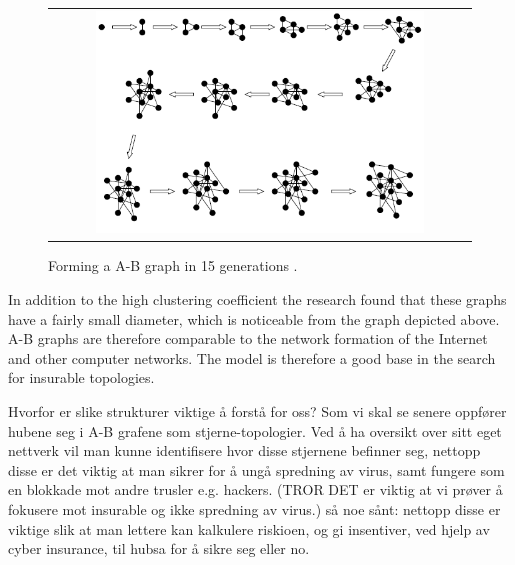 \begin{figure}
\centering
\begin{tabular}{@{}c@{}}
\includegraphics[width=0.8\textwidth]{../Figures/ABgraphcreation.png}
\end{tabular}
\caption{\label{fig:ABgraphcreation} Forming a A-B graph in 15 generations \cite{audestad}.}
\end{figure}

In addition to the high clustering coefficient the research found that these graphs have a fairly small diameter,
 which is noticeable from the graph depicted above. 
 A-B graphs are therefore comparable to the network formation of the Internet and other computer networks. 
The model is therefore a good base in the search for insurable topologies. 


Hvorfor er slike strukturer viktige å forstå for oss? 
Som vi skal se senere oppfører hubene seg i A-B grafene som stjerne-topologier. 
Ved å ha oversikt over sitt eget nettverk vil man kunne identifisere hvor disse stjernene befinner seg, nettopp disse er det viktig at man sikrer for å ungå spredning av virus, samt fungere som en blokkade mot andre trusler e.g. hackers. (TROR DET er viktig at vi prøver å fokusere mot insurable og ikke spredning av virus.)
så noe sånt:
nettopp disse er viktige slik at man lettere kan kalkulere riskioen, og gi insentiver, ved hjelp av cyber insurance, til hubsa for å sikre seg eller no.







